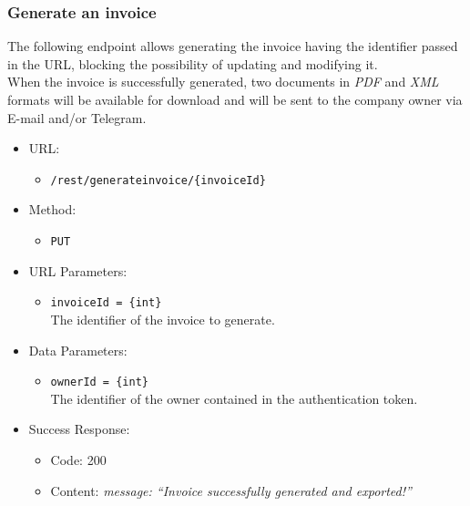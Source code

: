 \newpage
\subsubsection*{Generate an invoice}

The following endpoint allows generating the invoice having the identifier passed in the URL, blocking the possibility of updating and modifying it. \\
When the invoice is successfully generated, two documents in \textit{PDF} and \textit{XML} formats will be available for download and will be sent to the company owner via E-mail and/or Telegram.

\begin{itemize}

    \item URL:
    \begin{itemize}
        \item \texttt{/rest/generateinvoice/\{invoiceId\}}
    \end{itemize}

    \item Method:
    \begin{itemize}
        \item \texttt{PUT}
    \end{itemize}

    \item URL Parameters:
    \begin{itemize}
        \item \texttt{invoiceId = \{int\}} \\
        The identifier of the invoice to generate.
    \end{itemize}

    \item Data Parameters:
    \begin{itemize}
        \item \texttt{ownerId = \{int\}} \\
        The identifier of the owner contained in the authentication token.
    \end{itemize}

    \item Success Response:
    \begin{itemize}
        \item Code: 200
        \item Content:
        \textit{
{
    message: “Invoice successfully generated and exported!”
}
        }
    \end{itemize}


\end{itemize}
